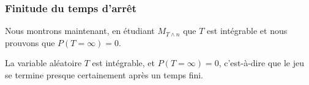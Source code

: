 \subsubsection{Finitude du temps d'arrêt}

Nous montrons maintenant, en étudiant \( M_{T\wedge n}\) que \( T\) est intégrable et nous prouvons que \( P(T=\infty)=0\).

\begin{proposition}
    La variable aléatoire \( T\) est intégrable, et \( P(T=\infty)=0\), c'est-à-dire que le jeu se termine presque certainement après un temps fini.
\end{proposition}

